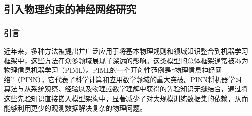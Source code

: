 \subsection{引入物理约束的神经网络研究}
\subsubsection{引言}
近年来，多种方法被提出并广泛应用于将基本物理规则和领域知识整合到机器学习框架中，这些方法在众多领域展现了深远的影响。这类模型的总体框架通常被称为物理信息机器学习（PIML）。PIML的一个开创性范例是“物理信息神经网络”（PINN），它代表了科学计算和应用数学领域的重大突破\cite{karniadakisPhysicsinformedMachineLearning2021,raissiPhysicsinformedNeuralNetworks2019}。PINN将机器学习算法与从系统观察、经验以及物理或数学理解中获得的先验知识无缝结合，通过将这些先验知识直接嵌入模型架构中，显著减少了对大规模训练数据集的依赖，从而能够利用更少的观测数据解决复杂的物理问题。


